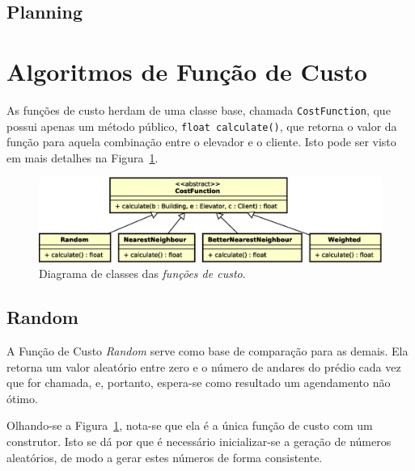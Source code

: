 
\subsection{\label{model:schedulers:planning}Planning}
\lipsum[5]


\section{\label{model:costfunctions}Algoritmos de Função de Custo}
As funções de custo herdam de uma classe base, chamada \texttt{CostFunction},
que possui apenas um método público, \texttt{float calculate()}, que retorna o
valor da função para aquela combinação entre o elevador e o cliente. Isto pode
ser visto em mais detalhes na Figura~\ref{fig:model:costfunction:uml:base}.


\begin{figure}[htb!]
  \centering
  \includegraphics[scale=0.6]{img/CostFunction}
  \caption{Diagrama de classes das \textit{funções de custo}.}
  \label{fig:model:costfunction:uml:base}
\end{figure}

\subsection{\label{model:costfunctions:random}Random}

A Função de Custo \textit{Random} serve como base de comparação para as demais.
Ela retorna um valor aleatório entre zero e o número de andares do prédio cada
vez que for chamada, e, portanto, espera-se como resultado um agendamento não
ótimo.

Olhando-se a Figura~\ref{fig:model:costfunction:uml:base}, nota-se que ela é a
única função de custo com um construtor. Isto se dá por que é necessário
inicializar-se a geração de números aleatórios, de modo a gerar estes números de
forma consistente.

